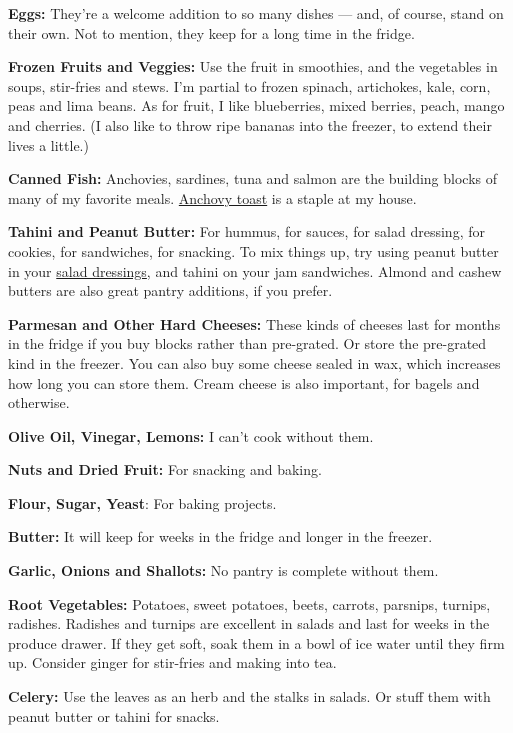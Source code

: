 \textbf{Eggs:} They're a welcome addition to so many dishes --- and, of
course, stand on their own. Not to mention, they keep for a long time in
the fridge.

\textbf{Frozen Fruits and Veggies:} Use the fruit in smoothies, and the
vegetables in soups, stir-fries and stews. I'm partial to frozen
spinach, artichokes, kale, corn, peas and lima beans. As for fruit, I
like blueberries, mixed berries, peach, mango and cherries. (I also like
to throw ripe bananas into the freezer, to extend their lives a little.)

\textbf{Canned Fish:} Anchovies, sardines, tuna and salmon are the
building blocks of many of my favorite meals.
\href{https://www.instagram.com/p/B9S6nDElI2B/}{Anchovy toast} is a
staple at my house.

\textbf{Tahini and Peanut Butter:} For hummus, for sauces, for salad
dressing, for cookies, for sandwiches, for snacking. To mix things up,
try using peanut butter in your
\href{https://cooking.nytimes3xbfgragh.onion/recipes/1012747-peanut-noodles-with-shrimp}{salad
dressings}, and tahini on your jam sandwiches. Almond and cashew butters
are also great pantry additions, if you prefer.

\textbf{Parmesan and Other Hard Cheeses:} These kinds of cheeses last
for months in the fridge if you buy blocks rather than pre-grated. Or
store the pre-grated kind in the freezer. You can also buy some cheese
sealed in wax, which increases how long you can store them. Cream cheese
is also important, for bagels and otherwise.

\textbf{Olive Oil, Vinegar, Lemons:} I can't cook without them.

\textbf{Nuts and Dried Fruit:} For snacking and baking.

\textbf{Flour, Sugar, Yeast}: For baking projects.

\textbf{Butter:} It will keep for weeks in the fridge and longer in the
freezer.

\textbf{Garlic, Onions and Shallots:} No pantry is complete without
them.

\textbf{Root Vegetables:} Potatoes, sweet potatoes, beets, carrots,
parsnips, turnips, radishes. Radishes and turnips are excellent in
salads and last for weeks in the produce drawer. If they get soft, soak
them in a bowl of ice water until they firm up. Consider ginger for
stir-fries and making into tea.

\textbf{Celery:} Use the leaves as an herb and the stalks in salads. Or
stuff them with peanut butter or tahini for snacks.


